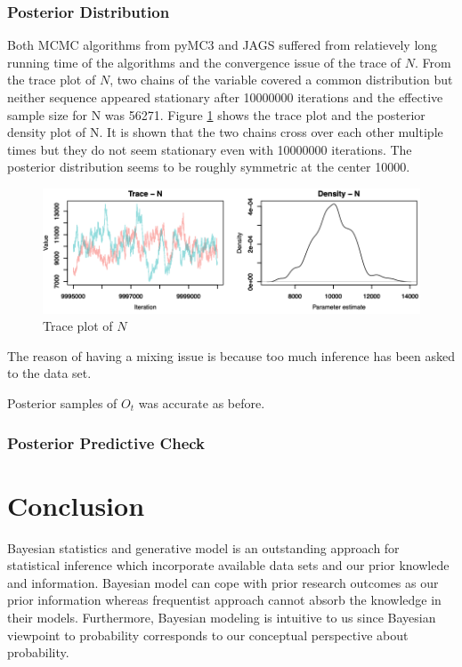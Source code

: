 \documentclass[12pt]{article}
\begin{document}
{\subsubsection{Posterior Distribution}
Both MCMC algorithms from pyMC3 and JAGS suffered from relatievely long running time of the algorithms and the convergence issue of the trace of $N$. From the trace plot of $N$, two chains of the variable covered a common distribution but neither sequence appeared stationary after 10000000 iterations and the effective sample size for N was 56271. Figure \ref{trace_N} shows the trace plot and the posterior density plot of N. It is shown that the two chains cross over each other multiple times but they do not seem stationary even with 10000000 iterations. The posterior distribution seems to be roughly symmetric at the center 10000. 
\begin{figure}[h]
	\centering
	\includegraphics[width=1\linewidth]{Figures/not_mixed_N.png}
	\caption{Trace plot of $N$}
	\label{trace_N}
\end{figure}

The reason of having a mixing issue is because too much inference has been asked to the data set. ~



Posterior samples of $O_t$ was accurate as before.

\subsubsection{Posterior Predictive Check}

\section{Conclusion}
 
Bayesian statistics and generative model is an outstanding approach for statistical inference which incorporate available data sets and our  prior knowlede and information. Bayesian model can cope with prior research outcomes as our prior information whereas frequentist approach cannot absorb the knowledge in their models. Furthermore, Bayesian modeling is intuitive to us since Bayesian viewpoint to probability corresponds to our conceptual perspective about probability. \\ 

}
\end{document}
